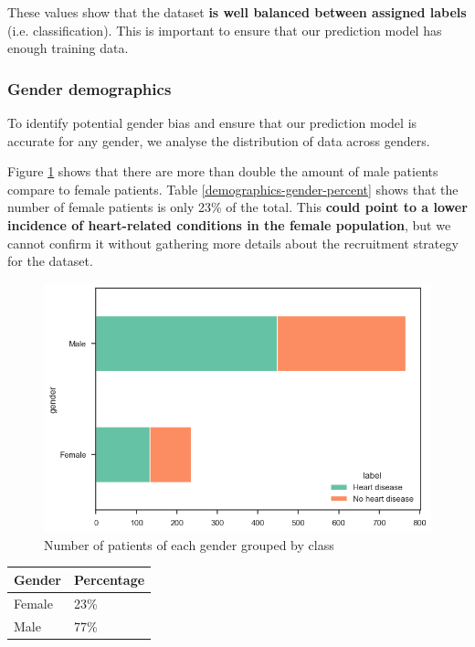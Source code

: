 These values show that the dataset \textbf{is well balanced between assigned labels} (i.e. classification). This
is important to ensure that our prediction model has enough training data.

\subsubsection{Gender demographics}

To identify potential gender bias and ensure that our prediction model is accurate for any gender, we analyse
the distribution of data across genders.

Figure \ref{demographics-gender-target-count} shows that there are more than double the amount of male patients
compare to female patients. Table \ref{demographics-gender-percent} shows that the number of female patients is
only 23\% of the total. This \textbf{could point to a lower incidence of heart-related conditions in the female population},
but we cannot confirm it without gathering more details about the recruitment strategy for the dataset.
    
\begin{figure}[H]
    \caption{Number of patients of each gender grouped by class}\label{demographics-gender-target-count}
    \centering
    \includegraphics[width=\linewidth]{media/demographics-03-gender-target-count.png}
\end{figure}

\small
\begin{tabularx}{\linewidth}{ | X | X |}
    \caption{Distribution of patients of each gender}\label{demographics-gender-percent} \\
    \hline
    \textbf{Gender} & \textbf{Percentage}\\
    \hline
    Female & 23\% \\
    \hline
    Male & 77\% \\
    \hline
\end{tabularx}
\normalsize

